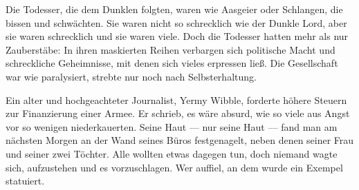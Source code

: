 Die Todesser, die dem Dunklen folgten, waren wie Aasgeier oder Schlangen, die bissen und schwächten. Sie waren nicht so schrecklich wie der Dunkle Lord, aber sie waren schrecklich und sie waren viele. Doch die Todesser hatten mehr als nur Zauberstäbe: In ihren maskierten Reihen verbargen sich politische Macht und schreckliche Geheimnisse, mit denen sich vieles erpressen ließ. Die Gesellschaft war wie paralysiert, strebte nur noch nach Selbsterhaltung.

Ein alter und hochgeachteter Journalist, Yermy Wibble, forderte höhere Steuern zur Finanzierung einer Armee. Er schrieb, es wäre absurd, wie so viele aus Angst vor so wenigen niederkauerten. Seine Haut — nur seine Haut — fand man am nächsten Morgen an der Wand seines Büros festgenagelt, neben denen seiner Frau und seiner zwei Töchter. Alle wollten etwas dagegen tun, doch niemand wagte sich, aufzustehen und es vorzuschlagen. Wer auffiel, an dem wurde ein Exempel statuiert.

